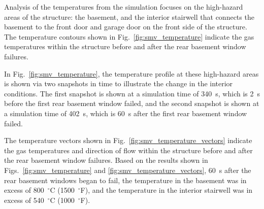 \documentclass[12pt,oneside]{book}
\begin{document}
Analysis of the temperatures from the simulation focuses on the high-hazard areas of the structure: the basement, and the interior stairwell that connects the basement to the front door and garage door on the front side of the structure. The temperature contours shown in Fig.~\ref{fig:smv_temperature} indicate the gas temperatures within the structure before and after the rear basement window failures.

In Fig.~\ref{fig:smv_temperature}, the temperature profile at these high-hazard areas is shown via two snapshots in time to illustrate the change in the interior conditions. The first snapshot is shown at a simulation time of 340~s, which is 2~s before the first rear basement window failed, and the second snapshot is shown at a simulation time of 402~s, which is 60~s after the first rear basement window failed.

The temperature vectors shown in Fig.~\ref{fig:smv_temperature_vectors} indicate the gas temperatures and direction of flow within the structure before and after the rear basement window failures. Based on the results shown in Figs.~\ref{fig:smv_temperature} and \ref{fig:smv_temperature_vectors}, 60~s after the rear basement windows began to fail, the temperature in the basement was in excess of 800~$^{\circ}$C (1500~$^{\circ}$F), and the temperature in the interior stairwell was in excess of 540~$^{\circ}$C (1000~$^{\circ}$F).
\end{document}
